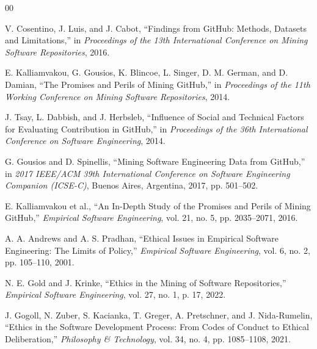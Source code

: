 \documentclass[conference]{IEEEtran}
\begin{document}
\begin{thebibliography}{00}

V. Cosentino, J. Luis, and J. Cabot,
``Findings from GitHub: Methods, Datasets and Limitations,''
in \textit{Proceedings of the 13th International Conference on Mining Software Repositories}, 2016.

E. Kalliamvakou, G. Gousios, K. Blincoe, L. Singer, D. M. German, and D. Damian,
``The Promises and Perils of Mining GitHub,''
in \textit{Proceedings of the 11th Working Conference on Mining Software Repositories}, 2014.

J. Tsay, L. Dabbish, and J. Herbsleb,
``Influence of Social and Technical Factors for Evaluating Contribution in GitHub,''
in \textit{Proceedings of the 36th International Conference on Software Engineering}, 2014.

G. Gousios and D. Spinellis,
``Mining Software Engineering Data from GitHub,''
in \textit{2017 IEEE/ACM 39th International Conference on Software Engineering Companion (ICSE-C)}, Buenos Aires, Argentina, 2017, pp. 501--502.

E. Kalliamvakou et al.,
``An In-Depth Study of the Promises and Perils of Mining GitHub,''
\textit{Empirical Software Engineering}, vol. 21, no. 5, pp. 2035--2071, 2016.

A. A. Andrews and A. S. Pradhan,
``Ethical Issues in Empirical Software Engineering: The Limits of Policy,''
\textit{Empirical Software Engineering}, vol. 6, no. 2, pp. 105--110, 2001.

N. E. Gold and J. Krinke,
``Ethics in the Mining of Software Repositories,''
\textit{Empirical Software Engineering}, vol. 27, no. 1, p. 17, 2022.

J. Gogoll, N. Zuber, S. Kacianka, T. Greger, A. Pretschner, and J. Nida-Rumelin,
``Ethics in the Software Development Process: From Codes of Conduct to Ethical Deliberation,''
\textit{Philosophy \& Technology}, vol. 34, no. 4, pp. 1085--1108, 2021.

\end{thebibliography}
\end{document}
